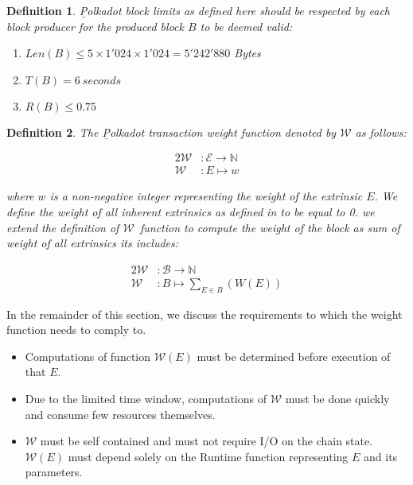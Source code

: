 \documentclass[11pt,a4paper]{article}
\newtheorem{definition}{Definition}
\newcommand{\TWF}{\ensuremath{\mathcal{W}}}
\begin{document}
\begin{definition}
  \label{def:polkadot-block-limits}
        {\b Polkadot block limits} as defined here should be respected by each
        block producer for the produced block $B$ to be deemed valid:
        
        \begin{enumerate}
         \item $Len(B) \le 5 \times 1'024 \times 1'024 = 5'242'880$ Bytes
         \item $T(B) = 6\ seconds$
         \item $R(B) \le 0.75$
        \end{enumerate}
        
\end{definition}

\begin{definition}
  \label{defn:weight-function}
  The {\b Polkadot transaction weight function} denoted by $\mathcal{W}$ as follows:

  \begin{alignat*}{2}
    \mathcal{W} &: \mathcal{E} \rightarrow \mathbb{N} \\
    \mathcal{W} &: E \mapsto w
  \end{alignat*}

  where $w$ is a non-negative integer representing the weight of the extrinsic
  $E$. We define the weight of all inherent extrinsics as defined in
  \cite[Definition~3.3]{web30_technologies_foundation_polkadot_2020} to be equal
  to 0. we extend the definition of \TWF\ function to compute the weight of the
  block as sum of weight of all extrinsics its includes:

  \begin{alignat*}{2}
    \mathcal{W} &: \mathcal{B}\rightarrow \mathbb{N} \\
    \mathcal{W} &: B \mapsto \sum_{E\in B}(W(E))
  \end{alignat*}
  
\end{definition}

In the remainder of this section, we discuss the requirements to which the
weight function needs to comply to.

\begin{itemize}

\item Computations of function $\mathcal{W}(E)$  must be determined before
execution of that $E$.

\item Due to the limited time window, computations of $\TWF$ must be done
      quickly and consume few resources themselves.
\item $\TWF$ must be self contained and must not require I/O on the chain state.
$\TWF(E)$ must depend solely on the Runtime function representing $E$ and its
parameters.

\end{itemize}
\end{document}
